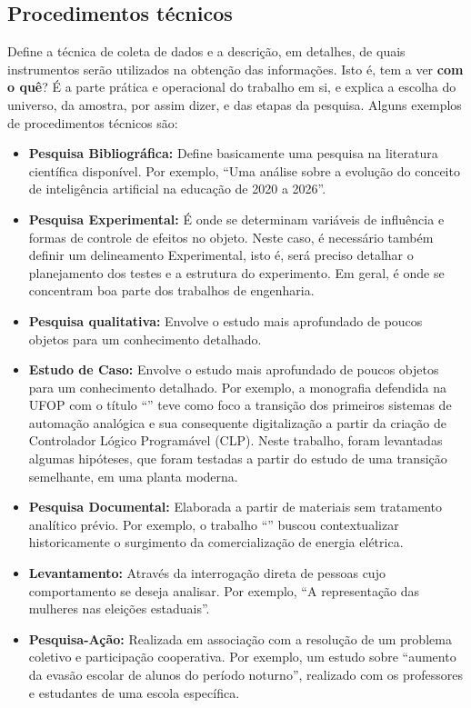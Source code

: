 \documentclass[
	12pt,				%
	openright,			%
	oneside,			%
	a4paper,			%
	english,			%
	brazil				%
	]{abntex2}
\begin{document}
	\subsection{Procedimentos técnicos}
		Define a técnica de coleta de dados e a descrição, em detalhes, de quais instrumentos serão utilizados na obtenção das informações. Isto é, tem a ver \textbf{com o quê}? É a parte prática e operacional do trabalho em si, e explica a escolha do universo, da amostra, por assim dizer, e das etapas da pesquisa. Alguns exemplos de procedimentos técnicos são:
	\begin{itemize}
		\item[a)] \textbf{Pesquisa Bibliográfica:} Define basicamente uma pesquisa na literatura científica disponível. Por exemplo, ``Uma análise sobre a evolução do conceito de inteligência artificial na educação de 2020 a 2026''. 
		\item[b)] \textbf{Pesquisa Experimental:} É onde se determinam variáveis de influência e formas de controle de efeitos no objeto. Neste caso, é necessário também definir um delineamento Experimental, isto é, será preciso detalhar o planejamento dos testes e a estrutura do experimento. Em geral, é onde se concentram boa parte dos trabalhos de engenharia. 
		\item[c)] \textbf{Pesquisa qualitativa:} Envolve o estudo mais aprofundado de poucos objetos para um conhecimento detalhado.
		\item[d)] \textbf{Estudo de Caso:} Envolve o estudo mais aprofundado de poucos objetos para um conhecimento detalhado. Por exemplo, a monografia defendida na UFOP com o título ``'' teve como foco a transição dos primeiros sistemas de automação analógica e sua consequente digitalização a partir da criação de Controlador Lógico Programável (CLP). Neste trabalho, foram levantadas algumas hipóteses, que foram testadas a partir do estudo de uma transição semelhante, em uma planta moderna. 
		\item[e)] \textbf{Pesquisa Documental:} Elaborada a partir de materiais sem tratamento analítico prévio. Por exemplo, o trabalho ``'' buscou contextualizar historicamente o surgimento da comercialização de energia elétrica.
		\item[f)] \textbf{Levantamento:} Através da interrogação direta de pessoas cujo comportamento se deseja analisar. Por exemplo, ``A representação das mulheres nas eleições estaduais''.
		\item[g)] \textbf{Pesquisa-Ação:} Realizada em associação com a resolução de um problema coletivo e participação cooperativa. Por exemplo, um estudo sobre ``aumento da evasão escolar de alunos do período noturno'', realizado com os professores e estudantes de uma escola específica.
	\end{itemize}
\end{document}
